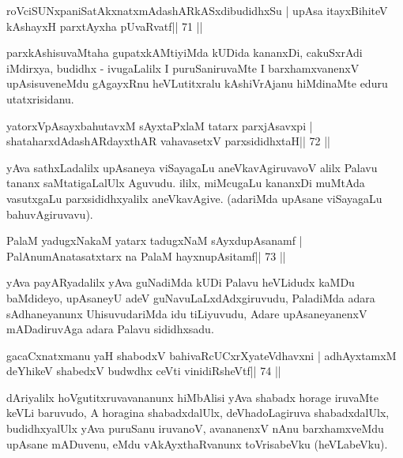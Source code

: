 \begin{shl}
roVciSUNxpaniSatAkxnatxmAdashARkASxdibudidhxSu |
upAsa itayxBihiteV kAshayxH parxtAyxha pUvaRvatf\hfill || 71 ||
\end{shl}

\begin{artha}
parxkAshisuvaMtaha gupatxkAMtiyiMda kUDida kananxDi, cakuSxrAdi  iMdirxya, budidhx - ivugaLalilx I puruSaniruvaMte I barxhamxvanenxV upAsisuveneMdu gAgayxRnu heVLutitxralu kAshiVrAjanu hiMdinaMte eduru utatxrisidanu.
\end{artha}


\begin{shl}
yatorxVpAsayxbahutavxM sAyxtaPxlaM tatarx parxjAsavxpi |
shataharxdAdashARdayxthAR vahavasetxV parxsididhxtaH\hfill || 72 ||
\end{shl}

\begin{artha}
yAva sathxLadalilx upAsaneya viSayagaLu aneVkavAgiruvavoV alilx Palavu tananx saMtatigaLalUlx Aguvudu. ililx, miMcugaLu kananxDi muMtAda vasutxgaLu parxsididhxyalilx aneVkavAgive. (adariMda upAsane viSayagaLu bahuvAgiruvavu).
\end{artha} 
 

\begin{shl}
PalaM yadugxNakaM yatarx tadugxNaM sAyxdupAsanamf |
PalAnumAnatasatxtarx na PalaM hayxnupAsitamf\hfill || 73 ||
\end{shl}

\begin{artha}
yAva payARyadalilx yAva guNadiMda kUDi Palavu heVLidudx kaMDu  baMdideyo, upAsaneyU adeV guNavuLaLxdAdxgiruvudu, PaladiMda adara  sAdhaneyanunx UhisuvudariMda idu tiLiyuvudu, Adare upAsaneyanenxV mADadiruvAga adara Palavu sididhxsadu.
\end{artha}


\begin{shl}
gacaCxnatxmanu yaH shabodxV bahivaRcUCxrXyateV\s dhavxni |
adhAyxtamxM deYhikeV shabedxV budwdhx ceVti vinidiRsheVtf\hfill || 74 ||
\end{shl}

\begin{artha}
dAriyalilx hoVgutitxruvavananunx hiMbAlisi yAva shabadx horage iruvaMte keVLi baruvudo, A horagina shabadxdalUlx, deVhadoLagiruva shabadxdalUlx, budidhxyalUlx yAva puruSanu iruvanoV, avananenxV nAnu barxhamxveMdu upAsane mADuvenu, eMdu vAkAyxthaRvanunx toVrisabeVku (heVLabeVku).
\end{artha} 
 
